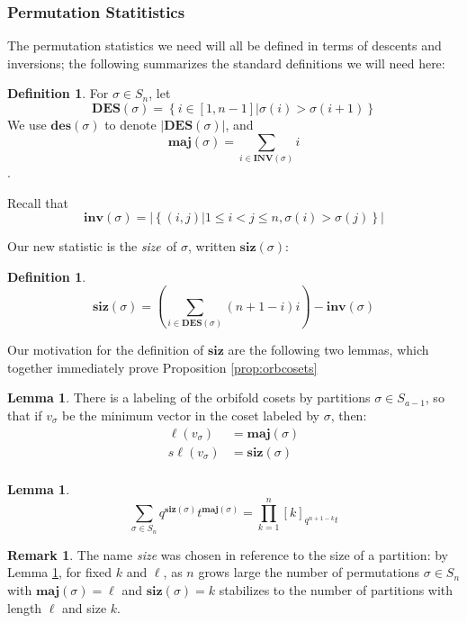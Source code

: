 \documentclass{amsart}[12pt]
\theoremstyle{definition}
\newtheorem{lemma}[dummy]{Lemma}
\newtheorem{definition}[dummy]{Definition}
\newtheorem{remark}[dummy]{Remark}
\newcommand{\sk}{s\ell}
\newcommand{\inv}{\mathbf{inv}}
\newcommand{\INV}{\mathbf{INV}}
\newcommand{\DES}{\mathbf{DES}}
\newcommand{\des}{\mathbf{des}}
\newcommand{\maj}{\mathbf{maj}}
\newcommand{\siz}{\mathbf{siz}}
\begin{document}
\subsubsection{Permutation Statitistics}
The permutation statistics we need will all be defined in terms of descents and inversions; the following summarizes the standard definitions we will need here:
\begin{definition} \label{def:standardpermutations}
For $\sigma\in S_n$, let 
$$\DES(\sigma)=\left\{i\in [1, n-1] \Big | \sigma(i)>\sigma(i+1)\right\}$$
We use $\des(\sigma)$ to denote $|\DES(\sigma)|$, and 
$$\maj(\sigma)=\sum_{i\in\INV(\sigma)} i$$.

Recall that 
$$\inv(\sigma)=\left|\left\{(i,j)\big| 1\leq i<j\leq n, \sigma(i)>\sigma(j)\right\}\right|$$
\end{definition}

Our new statistic is the $\emph{size}$ of $\sigma$, written $\siz(\sigma)$: 

\begin{definition} \label{def:sizepermutation}
$$\siz(\sigma)=\left(\sum_{i\in\DES(\sigma)} (n+1-i)i\right)-\inv(\sigma)$$
\end{definition}


Our motivation for the definition of $\siz$ are the following two lemmas, which together immediately prove Proposition \ref{prop:orbcosets}

\begin{lemma} \label{lem:sizmaj1}
There is a labeling of the orbifold cosets by partitions $\sigma\in S_{a-1}$, so that if $v_\sigma$ be the minimum vector in the coset labeled by $\sigma$, then:
\begin{align*}
\ell(v_\sigma)&=\maj(\sigma) \\
\sk(v_\sigma)&=\siz(\sigma)\\
\end{align*}

\end{lemma}

\begin{lemma} \label{lem:sizmaj2}
$$\sum_{\sigma\in S_n} q^{\siz(\sigma)} t^{\maj(\sigma)}=\prod_{k=1}^n [k]_{q^{n+1-k}t}$$
\end{lemma}


\begin{remark}
The name \emph{size} was chosen in reference to the size of a partition: by Lemma \ref{lem:sizmaj2}, for fixed $k$ and $\ell$, as $n$ grows large the number of permutations $\sigma\in S_n$ with $\maj(\sigma)=\ell$ and $\siz(\sigma)=k$ stabilizes to the number of partitions with length $\ell$ and size $k$.
\end{remark}
\end{document}
